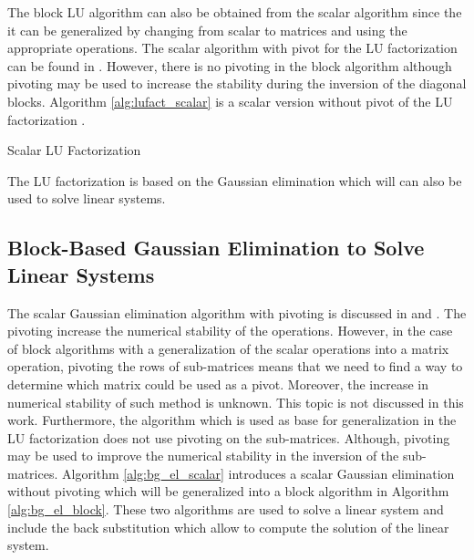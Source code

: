 
The block LU algorithm can also be obtained from the scalar algorithm since the it can be generalized by changing from scalar to matrices and using the appropriate operations.
The scalar algorithm with pivot for the LU factorization can be found in \cite{BissV1988} \cite{Velde1990}.
However, there is no pivoting in the block algorithm although pivoting may be used to increase the stability during the inversion of the diagonal blocks.
Algorithm \ref{alg:lufact_scalar} is a scalar version without pivot of the LU factorization \cite{GoluL1983}.

\begin{algorithm}[h]
	\DontPrintSemicolon
	\caption{Scalar LU Factorization\label{alg:lufact_scalar}}
\end{algorithm}

The LU factorization is based on the Gaussian elimination which will can also be used to solve linear systems.

\subsection{Block-Based Gaussian Elimination to Solve Linear Systems}

The scalar Gaussian elimination algorithm with pivoting is discussed in \cite{Saad1986} and \cite{GeorC1987}.
The pivoting increase the numerical stability of the operations.
However, in the case of block algorithms with a generalization of the scalar operations into a matrix operation, pivoting the rows of sub-matrices means that we need to find a way to determine which matrix could be used as a pivot.
Moreover, the increase in numerical stability of such method is unknown.
This topic is not discussed in this work.
Furthermore, the algorithm which is used as base for generalization in the LU factorization does not use pivoting on the sub-matrices.
Although, pivoting may be used to improve the numerical stability in the inversion of the sub-matrices.
Algorithm \ref{alg:bg_el_scalar} introduces a scalar Gaussian elimination without pivoting \cite{GoluL1983} which will be generalized into a block algorithm in Algorithm \ref{alg:bg_el_block}.
These two algorithms are used to solve a linear system and include the back substitution which allow to compute the solution of the linear system.


